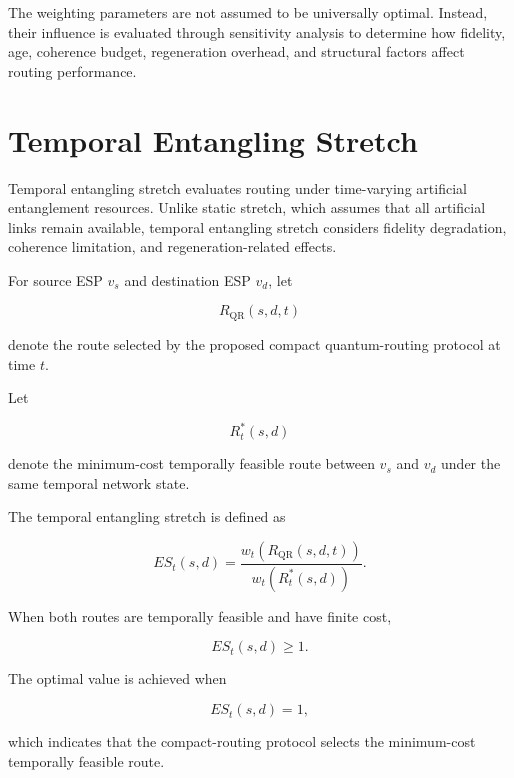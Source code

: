 The weighting parameters are not assumed to be universally optimal. Instead, their influence is evaluated through sensitivity analysis to determine how fidelity, age, coherence budget, regeneration overhead, and structural factors affect routing performance.
\section{Temporal Entangling Stretch}

Temporal entangling stretch evaluates routing under time-varying artificial
entanglement resources. Unlike static stretch, which assumes that all artificial links remain available, temporal entangling stretch considers fidelity degradation, coherence limitation, and regeneration-related effects.

For source ESP $v_s$ and destination ESP $v_d$, let

\begin{equation}
    R_{\mathrm{QR}}(s,d,t)
\end{equation}

denote the route selected by the proposed compact quantum-routing protocol at time $t$.

Let

\begin{equation}
    R_t^{*}(s,d)
\end{equation}

denote the minimum-cost temporally feasible route between $v_s$ and $v_d$ under the same temporal network state.

The temporal entangling stretch is defined as

\begin{equation}
    ES_t(s,d)
    =
    \frac{
    w_t
    \left(
    R_{\mathrm{QR}}(s,d,t)
    \right)
    }
    {
    w_t
    \left(
    R_t^{*}(s,d)
    \right)
    }.
\end{equation}

When both routes are temporally feasible and have finite cost,

\begin{equation}
    ES_t(s,d)\geq1 .
\end{equation}

The optimal value is achieved when

\begin{equation}
    ES_t(s,d)=1,
\end{equation}

which indicates that the compact-routing protocol selects the minimum-cost temporally feasible route.

